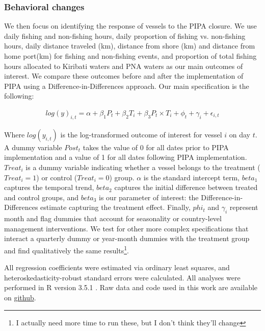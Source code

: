 \documentclass[9p,twocolumn,twoside,lineno]{pnas-new}
\begin{document}
\subsubsection{Behavioral changes}

We then focus on identifying the response of vessels to the PIPA closure. We use daily fishing and non-fishing hours, daily proportion of fishing vs. non-fishing hours, daily distance traveled (km), distance from shore (km) and distance from home port(km) for fishing and non-fishing events, and proportion of total fishing hours allocated to Kiribati waters and PNA waters as our main outcomes of interest. We compare these outcomes before and after the implementation of PIPA using a Difference-in-Differences approach. Our main specification is the following:

\begin{figure}[H]
\begin{align}
log(y)_{i,t} = \alpha + \beta_1 P_t + \beta_2 T_i + \beta_3 P_t \times T_i + \phi_t + \gamma_i + \epsilon_{i,t}
\label{eqn:did}
\end{align}
\end{figure}

Where $log(y_{i,t})$ is the log-transformed outcome of interest for vessel $i$ on day $t$. A dummy variable $Post_t$ takes the value of 0 for all dates prior to PIPA implementation and a value of 1 for all dates following PIPA implementation. $Treat_i$ is a dummy variable indicating whether a vessel belongs to the treatment ($Treat_i = 1$) or control ($Treat_i = 0$) group. $\alpha$ is the standard intercept term, $beta_1$ captures the temporal trend, $beta_2$ captures the initial difference between treated and control groups, and $beta_3$ is our parameter of interest: the Difference-in-Differences estimate capturing the treatment effect. Finally, $phi_t$ and $\gamma_i$ represent month and flag dummies that account for seasonality or country-level management interventions. We test for other more complex specifications that interact a quarterly dummy or year-month dummies with the treatment group and find qualitatively the same results\footnote{I actually need more time to run these, but I don't think they'll change}.

All regression coefficients were estimated via ordinary least squares, and heteroskedasticity-robust standard errors were calculated. All analyses were performed in R version 3.5.1 \citep{rcore_2018}. Raw data and code used in this work are available on \href{https://github.com/jcvdav/MPA_displacement}{github}.
\end{document}
